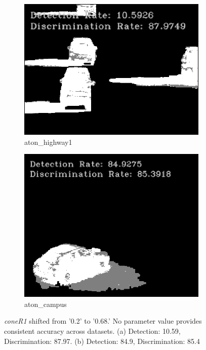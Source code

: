 \begin{figure}
  \centering
  \begin{subfigure}{.49\linewidth}
    \includegraphics[width=1\linewidth]{figures/background/phys_highway1_680.png}
    \caption{aton\_highway1}
  \end{subfigure}
  \hfill
  \begin{subfigure}{.45\linewidth}
    \includegraphics[width=1\linewidth]{figures/background/phys_campus_680.png}
    \caption{aton\_campus}
  \end{subfigure}
  \caption{\textit{coneR1} shifted from '0.2' to '0.68.' No parameter value provides consistent accuracy across datasets. (a) Detection: 10.59, Discrimination: 87.97. (b) Detection: 84.9, Discrimination: 85.4}
  \label{fig:coner168}
\end{figure}

